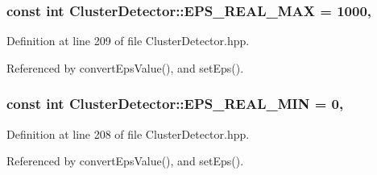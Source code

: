 \hypertarget{classmultiscale_1_1analysis_1_1ClusterDetector_a3e60b9e068a8addf9dd27382c74e6d62}{
\subsubsection[{E\-P\-S\-\_\-\-R\-E\-A\-L\-\_\-\-M\-A\-X}]{\setlength{\rightskip}{0pt plus 5cm}const int Cluster\-Detector\-::\-E\-P\-S\-\_\-\-R\-E\-A\-L\-\_\-\-M\-A\-X = 1000\hspace{0.3cm}{\ttfamily [static]}, {\ttfamily [private]}}}\label{classmultiscale_1_1analysis_1_1ClusterDetector_a3e60b9e068a8addf9dd27382c74e6d62}


Definition at line 209 of file Cluster\-Detector.\-hpp.



Referenced by convert\-Eps\-Value(), and set\-Eps().

\hypertarget{classmultiscale_1_1analysis_1_1ClusterDetector_ad9542bde7e3bf36d501a0b203dc61e09}{
\subsubsection[{E\-P\-S\-\_\-\-R\-E\-A\-L\-\_\-\-M\-I\-N}]{\setlength{\rightskip}{0pt plus 5cm}const int Cluster\-Detector\-::\-E\-P\-S\-\_\-\-R\-E\-A\-L\-\_\-\-M\-I\-N = 0\hspace{0.3cm}{\ttfamily [static]}, {\ttfamily [private]}}}\label{classmultiscale_1_1analysis_1_1ClusterDetector_ad9542bde7e3bf36d501a0b203dc61e09}


Definition at line 208 of file Cluster\-Detector.\-hpp.



Referenced by convert\-Eps\-Value(), and set\-Eps().


